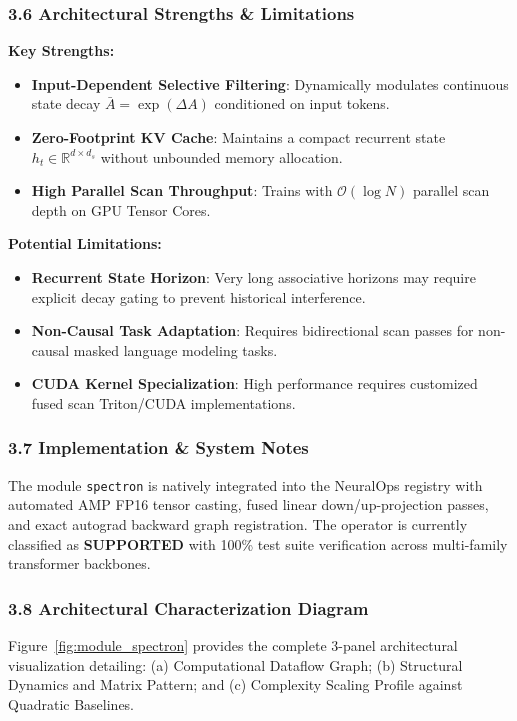 \subsubsection*{3.6 Architectural Strengths \& Limitations}
\textbf{Key Strengths:}
\begin{itemize}
    \item \textbf{Input-Dependent Selective Filtering}: Dynamically modulates continuous state decay $\bar{A} = \exp(\Delta A)$ conditioned on input tokens.
    \item \textbf{Zero-Footprint KV Cache}: Maintains a compact recurrent state $h_t \in \mathbb{R}^{d \times d_s}$ without unbounded memory allocation.
    \item \textbf{High Parallel Scan Throughput}: Trains with $\mathcal{O}(\log N)$ parallel scan depth on GPU Tensor Cores.
\end{itemize}

\textbf{Potential Limitations:}
\begin{itemize}
    \item \textbf{Recurrent State Horizon}: Very long associative horizons may require explicit decay gating to prevent historical interference.
    \item \textbf{Non-Causal Task Adaptation}: Requires bidirectional scan passes for non-causal masked language modeling tasks.
    \item \textbf{CUDA Kernel Specialization}: High performance requires customized fused scan Triton/CUDA implementations.
\end{itemize}

\subsubsection*{3.7 Implementation \& System Notes}
The module \texttt{spectron} is natively integrated into the NeuralOps registry with automated AMP FP16 tensor casting, fused linear down/up-projection passes, and exact autograd backward graph registration. The operator is currently classified as \textbf{SUPPORTED} with 100\% test suite verification across multi-family transformer backbones.

\subsubsection*{3.8 Architectural Characterization Diagram}
Figure~\ref{fig:module_spectron} provides the complete 3-panel architectural visualization detailing: (a) Computational Dataflow Graph; (b) Structural Dynamics and Matrix Pattern; and (c) Complexity Scaling Profile against Quadratic Baselines.

